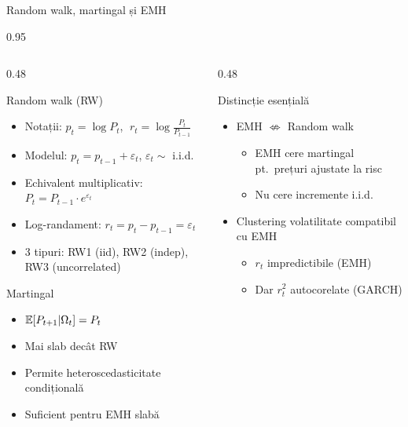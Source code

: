 \documentclass[9pt, aspectratio=169, t]{beamer}
\begin{document}
\begin{frame}[shrink=15]{Random walk, martingal și EMH}
\begin{cminipage}{0.95\textwidth}
\begin{columns}[T]
\begin{column}{0.48\textwidth}
\begin{block}{Random walk (RW)}
\begin{itemize}\setlength{\itemsep}{0pt}
    \item Notații: $p_t = \log P_t$, $\;r_t = \log\frac{P_t}{P_{t-1}}$
    \item Modelul: $p_t = p_{t-1} + \varepsilon_t$, $\varepsilon_t \sim$ i.i.d.
    \item Echivalent multiplicativ: $P_t = P_{t-1} \cdot e^{\varepsilon_t}$
    \item Log-randament: $r_t = p_t - p_{t-1} = \varepsilon_t$
    \item 3 tipuri: RW1 (iid), RW2 (indep), RW3 (uncorrelated)
\end{itemize}
\end{block}

\begin{block}{Martingal}
\begin{itemize}\setlength{\itemsep}{0pt}
    \item $\mathbb{E}[P_{t+1} | \Omega_t] = P_t$
    \item Mai slab decât RW
    \item Permite heteroscedasticitate condițională
    \item Suficient pentru EMH slabă
\end{itemize}
\end{block}
\end{column}
\begin{column}{0.48\textwidth}
\begin{alertblock}{Distincție esențială}
\begin{itemize}\setlength{\itemsep}{0pt}
    \item EMH $\not\Leftrightarrow$ Random walk
    \begin{itemize}\setlength{\itemsep}{0pt}
        \item EMH cere martingal pt.\ prețuri ajustate la risc
        \item Nu cere incremente i.i.d.
    \end{itemize}
    \item Clustering volatilitate compatibil cu EMH
    \begin{itemize}\setlength{\itemsep}{0pt}
        \item $r_t$ impredictibile (EMH)
        \item Dar $r_t^2$ autocorelate (GARCH)
    \end{itemize}
\end{itemize}
\end{alertblock}
\end{column}
\end{columns}
\end{cminipage}
\vspace{0.05cm}
\end{frame}
\end{document}
